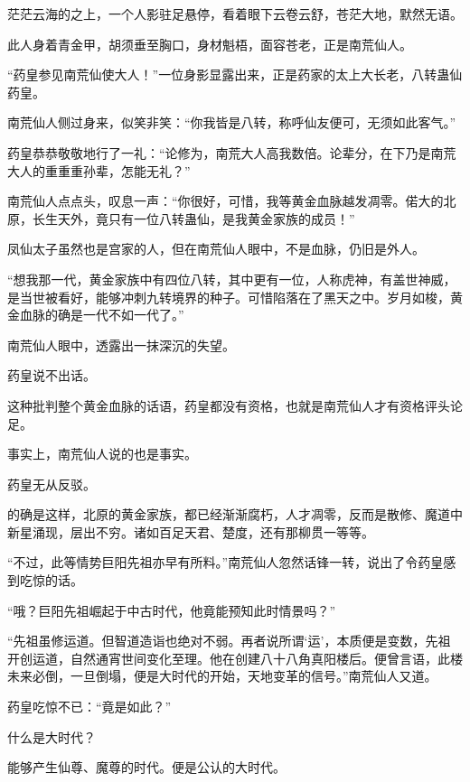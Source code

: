 
\begin{this_body}



茫茫云海的之上，一个人影驻足悬停，看着眼下云卷云舒，苍茫大地，默然无语。

此人身着青金甲，胡须垂至胸口，身材魁梧，面容苍老，正是南荒仙人。

“药皇参见南荒仙使大人！”一位身影显露出来，正是药家的太上大长老，八转蛊仙药皇。

南荒仙人侧过身来，似笑非笑：“你我皆是八转，称呼仙友便可，无须如此客气。”

药皇恭恭敬敬地行了一礼：“论修为，南荒大人高我数倍。论辈分，在下乃是南荒大人的重重重孙辈，怎能无礼？”

南荒仙人点点头，叹息一声：“你很好，可惜，我等黄金血脉越发凋零。偌大的北原，长生天外，竟只有一位八转蛊仙，是我黄金家族的成员！”

凤仙太子虽然也是宫家的人，但在南荒仙人眼中，不是血脉，仍旧是外人。

“想我那一代，黄金家族中有四位八转，其中更有一位，人称虎神，有盖世神威，是当世被看好，能够冲刺九转境界的种子。可惜陷落在了黑天之中。岁月如梭，黄金血脉的确是一代不如一代了。”

南荒仙人眼中，透露出一抹深沉的失望。

药皇说不出话。

这种批判整个黄金血脉的话语，药皇都没有资格，也就是南荒仙人才有资格评头论足。

事实上，南荒仙人说的也是事实。

药皇无从反驳。

的确是这样，北原的黄金家族，都已经渐渐腐朽，人才凋零，反而是散修、魔道中新星涌现，层出不穷。诸如百足天君、楚度，还有那柳贯一等等。

“不过，此等情势巨阳先祖亦早有所料。”南荒仙人忽然话锋一转，说出了令药皇感到吃惊的话。

“哦？巨阳先祖崛起于中古时代，他竟能预知此时情景吗？”

“先祖虽修运道。但智道造诣也绝对不弱。再者说所谓‘运’，本质便是变数，先祖开创运道，自然通宵世间变化至理。他在创建八十八角真阳楼后。便曾言语，此楼未来必倒，一旦倒塌，便是大时代的开始，天地变革的信号。”南荒仙人又道。

药皇吃惊不已：“竟是如此？”

什么是大时代？

能够产生仙尊、魔尊的时代。便是公认的大时代。


\end{this_body}
